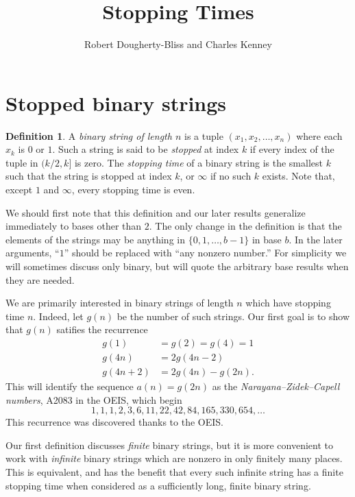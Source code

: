 \documentclass[12pt]{amsart}
\title{Stopping Times}
\author{Robert Dougherty-Bliss and Charles Kenney}
\theoremstyle{definition}
\newtheorem{definition}{Definition}
\begin{document}
\maketitle

\section{Stopped binary strings}
\label{sec:stopped_binary_strings}

\begin{definition}
    A \emph{binary string of length $n$} is a tuple $(x_1, x_2, \dots, x_n)$
    where each $x_k$ is $0$ or $1$. Such a string is said to be \emph{stopped}
    at index $k$ if every index of the tuple in $(k / 2, k]$ is zero. The
    \emph{stopping time} of a binary string is the smallest $k$ such that the
    string is stopped at index $k$, or $\infty$ if no such $k$ exists. Note
    that, except $1$ and $\infty$, every stopping time is even.
\end{definition}

We should first note that this definition and our later results generalize
immediately to bases other than $2$. The only change in the definition is that
the elements of the strings may be anything in $\{0, 1, \dots, b - 1\}$ in base
$b$. In the later arguments, ``$1$'' should be replaced with ``any nonzero
number.''  For simplicity we will sometimes discuss only binary, but will quote
the arbitrary base results when they are needed.

We are primarily interested in binary strings of length $n$ which have stopping
time $n$. Indeed, let $g(n)$ be the number of such strings. Our first goal is
to show that $g(n)$ satifies the recurrence
\begin{align*}
    g(1) &= g(2) = g(4) = 1 \\
    g(4n) &= 2 g(4n - 2) \\
    g(4n + 2) &= 2 g(4n) - g(2n).
\end{align*}
This will identify the sequence $a(n) = g(2n)$ as the
\emph{Narayana--Zidek--Capell numbers}, A2083 in the OEIS, which begin
\begin{equation*}
    1, 1, 1, 2, 3, 6, 11, 22, 42, 84, 165, 330, 654, \dots
\end{equation*}
This recurrence was discovered thanks to the OEIS.

Our first definition discusses \emph{finite} binary strings, but it is more
convenient to work with \emph{infinite} binary strings which are nonzero in
only finitely many places. This is equivalent, and has the benefit that every
such infinite string has a finite stopping time when considered as a
sufficiently long, finite binary string.
\end{document}
